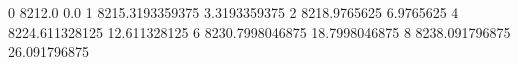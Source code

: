 0 8212.0 0.0
1 8215.3193359375 3.3193359375
2 8218.9765625 6.9765625
4 8224.611328125 12.611328125
6 8230.7998046875 18.7998046875
8 8238.091796875 26.091796875
